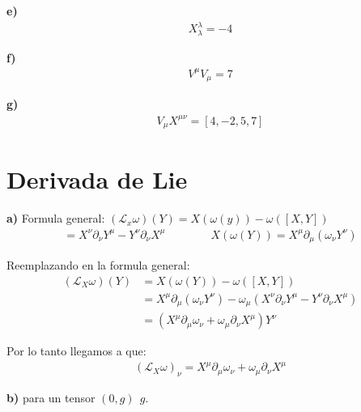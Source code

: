 \documentclass{article}
\begin{document}
\hfill 

\textbf{e) } 
\begin{gather*}
    X ^\lambda _ {\lambda} = -4
\end{gather*}

\hfill 

\textbf{f) } 
\begin{gather*}
    V ^ {\mu} V _{\mu}  = 7
\end{gather*}

\hfill 

\textbf{g) } 
\begin{gather*}
    V _ {\mu} X ^{\mu\nu}  = \left[4, -2, 5, 7\right]
\end{gather*}






\section{Derivada de Lie }

\textbf{a) } Formula general: $ (\mathcal{L}_x \omega)(Y) = X(\omega(y)) - \omega([X,Y]) $
\begin{align*}
  [X,Y] = X ^ {\nu} \partial_\nu Y ^ {\mu} - Y ^ {\nu} \partial_\nu X ^ {\mu} \qquad \qquad X(\omega(Y)) = X ^ {\mu} \partial _{\mu} (\omega _{\nu} Y ^ {\nu})
\end{align*}

Reemplazando en la formula general:
\begin{align*}
  (\mathcal{L}_{X } \omega) (Y) &= X(\omega(Y)) - \omega([X,Y])\\
                 &= X ^ {\mu} \partial _{\mu} (\omega _{\nu}  Y ^ {\nu}) - \omega _{\mu} (X ^ {\nu} \partial _{\nu} Y ^ {\mu} - Y ^ {\nu} \partial _{\nu}  X ^ {\mu}) \\
                 &= (X ^ {\mu} \partial _{\mu} \omega _{\nu} + \omega _{\mu}\partial _{\nu} X ^ {\mu}) Y ^ {\nu} 
\end{align*}

Por lo tanto llegamos a que:
\begin{gather*}
  (\mathcal{L}_{X } \omega) _{\nu}  = X ^ {\mu} \partial_\mu \omega_\nu + \omega_\mu \partial_\nu X ^ {\mu}
\end{gather*}

\hfill 

\hfill

\textbf{b) } para un tensor $ (0,g) \ \ g  $.

\hfill
\end{document}
